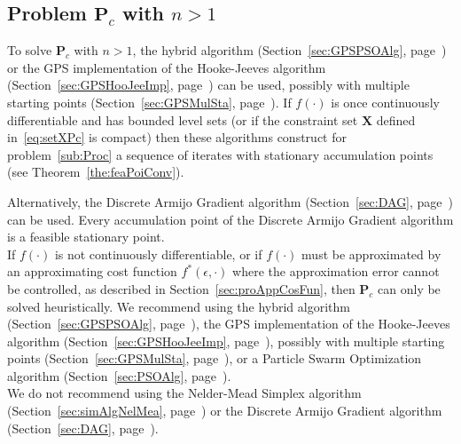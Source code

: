 \subsection{Problem $\mathbf P_{c}$ with $n>1$}
To solve $\mathbf P_{c}$ with $n>1$, 
the hybrid algorithm (Section~\ref{sec:GPSPSOAlg}, page~\pageref{sec:GPSPSOAlg}) or
the GPS implementation of the Hooke-Jeeves algorithm
(Section~\ref{sec:GPSHooJeeImp}, page~\pageref{sec:GPSHooJeeImp}) can be used,
possibly with multiple starting points (Section~\ref{sec:GPSMulSta}, page~\pageref{sec:GPSMulSta}).
If $f(\cdot)$ is once continuously differentiable
and has bounded level sets (or if the constraint set $\mathbf X$
defined in~\eqref{eq:setXPc} is compact)
then these algorithms construct for problem~\eqref{sub:Proc}
a sequence of iterates with stationary accumulation points 
(see Theorem~\ref{the:feaPoiConv}).

Alternatively, the Discrete Armijo Gradient algorithm
(Section~\ref{sec:DAG}, page~\pageref{sec:DAG}) can be used.
Every accumulation point of the
Discrete Armijo Gradient algorithm is a feasible stationary point.\\

If $f(\cdot)$ is not continuously differentiable, or if
$f(\cdot)$ must be approximated by an approximating cost function $f^*(\epsilon,\cdot)$
where the approximation error cannot be controlled,
as described in Section~\ref{sec:proAppCosFun}, then $\mathbf P_c$ can only be solved
heuristically.
We recommend using
the hybrid algorithm (Section~\ref{sec:GPSPSOAlg}, page~\pageref{sec:GPSPSOAlg}),
the GPS implementation of the Hooke-Jeeves algorithm 
(Section~\ref{sec:GPSHooJeeImp}, page~\pageref{sec:GPSHooJeeImp}), 
possibly with multiple starting points (Section~\ref{sec:GPSMulSta}, page~\pageref{sec:GPSMulSta}),
or a Particle Swarm Optimization algorithm
(Section~\ref{sec:PSOAlg}, page~\pageref{sec:PSOAlg}).\\

We do not recommend using the Nelder-Mead Simplex algorithm 
(Section~\ref{sec:simAlgNelMea}, page~\pageref{sec:simAlgNelMea}) or
the Discrete Armijo Gradient algorithm
(Section~\ref{sec:DAG}, page~\pageref{sec:DAG}).\\

